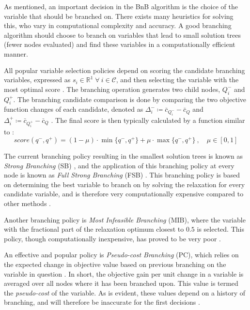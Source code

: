 As mentioned, an important decision in the \gls{BnB} algorithm is the choice of the variable that should be branched on. 
There exists many heuristics for solving this, who vary in computational complexity and accuracy. 
A good branching algorithm should choose to branch on variables that lead to small solution trees (fewer nodes evaluated) and find these variables in a computationally efficient manner. 

All popular variable selection policies depend on scoring the candidate branching variables, expressed as $s_i \in \mathbb{R}^1 \; \forall \: i \in \mathcal{C}$, and then selecting the variable with the most optimal score \cite{achterberg2004branching}. The branching operation generates two child nodes, $Q_i^-$ and $Q_i^+$. The branching candidate comparison is done by comparing the two objective function changes of each candidate, denoted as $\Delta_i^- \coloneqq \bar{c}_{Q_i^-}-\bar{c}_{Q}$ and $\Delta_i^+ \coloneqq \bar{c}_{Q_i^+}-\bar{c}_{Q}$ \cite{achterberg2004branching}. The final score is then typically calculated by a function similar to \cite{achterberg2004branching}:
\begin{equation}
    score(q^- , q^+ ) = (1 - \mu) \cdot \min \{q^- , q^+ \} + \mu \cdot \max \{q^- , q^+ \}\:,\quad \mu \in \left[0, 1\right]    
\end{equation}



The current branching policy resulting in the smallest solution trees is known as \textit{Strong Branching} (\gls{SB}) \cite{applegate1995finding}, and the application of this branching policy at every node is known as \textit{Full Strong Branching} (\gls{FSB}) \cite{achterberg2004branching}. This branching policy is based on determining the best variable to branch on by solving the relaxation for every candidate variable, and is therefore very computationally expensive compared to other methods \cite{achterberg2004branching}.

Another branching policy is \textit{Most Infeasible Branching} (\gls{MIB}), where the variable with the fractional part of the relaxation optimum closest to $0.5$ is selected. This policy, though computationally inexpensive, has proved to be very poor \cite{achterberg2004branching}. 
 
An effective and popular policy is \textit{Pseudo-cost Branching} (\gls{PC}), which relies on the expected change in objective value based on previous branching on the variable in question
\cite{achterberg2004branching}. In short, the objective gain per unit change in a variable is averaged over all nodes where it has been branched upon. This value is termed the \textit{pseudo-cost} of the variable. As is evident, these values depend on a history of branching, and will therefore be inaccurate for the first decisions \cite{achterberg2004branching}. 

